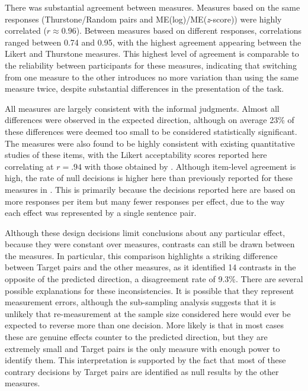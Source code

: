 \documentclass[doc]{apa6}
\newcommand{\targchoice}{{\sc Target pairs}}
\newcommand{\rndchoice}{{\sc Random pairs}}
\newcommand{\MElog}{{\sc ME{(log)}}}
\newcommand{\MEz}{{\sc ME{({\it z}-score)}}}
\newcommand{\thurstone}{{\sc Thurstone}}
\newcommand{\likert}{{\sc Likert}}
\begin{document}
There was substantial agreement between measures. Measures based on the same responses (\thurstone/\rndchoice{} and \MElog/\MEz) were highly correlated ($r \approx 0.96$). Between measures based on different responses, correlations ranged between 0.74 and 0.95, with the highest agreement appearing between the \likert{} and \thurstone{} measures. This highest level of agreement is comparable to the reliability between participants for these measures, indicating that switching from one measure to the other introduces no more variation than using the same measure twice, despite substantial differences in the presentation of the task.

All measures are largely consistent with the informal judgments. Almost all differences were observed in the expected direction, although on average 23\% of these differences were deemed too small to be considered statistically significant.
The measures were also found to be highly consistent with existing quantitative studies of these items, with the Likert acceptability scores reported here correlating at $r=.94$ with those obtained by \citet{sprouse2013formalinformal}. Although item-level agreement is high, the rate of null decisions is higher here than previously reported for these measures in \citet{sprouse2013formalinformal}. This is primarily because the decisions reported here are based on more responses per item but many fewer responses per effect, due to the way each effect was represented by a single sentence pair.

Although these design decisions limit conclusions about any particular effect, because they were constant over measures, contrasts can still be drawn between the measures.
In particular, this comparison highlights a striking difference between \targchoice{} and the other measures, as it identified 14 contrasts in the opposite of the predicted direction, a disagreement rate of 9.3\%. There are several possible explanations for these inconsistencies. It is possible that they represent measurement errors, although the sub-sampling analysis suggests that it is unlikely that re-measurement at the sample size considered here would ever be expected to reverse more than one decision. More likely is that in most cases these are genuine effects counter to the predicted direction, but they are extremely small and \targchoice{} is the only measure with enough power to identify them. This interpretation is supported by the fact that most of these contrary decisions by \targchoice{} are identified as null results by the other measures.
\end{document}
